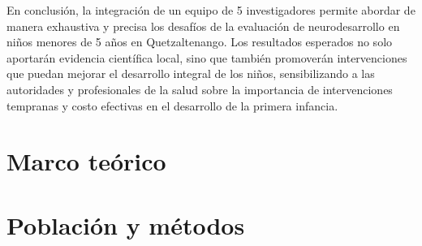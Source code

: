 \documentclass[11pt,letterpaper]{report}
\begin{document}
En conclusión, la integración de un equipo de 5 investigadores permite abordar
de manera exhaustiva y precisa los desafíos de la evaluación de neurodesarrollo
en niños menores de 5 años en Quetzaltenango. Los resultados esperados no solo
aportarán evidencia científica local, sino que también promoverán
intervenciones que puedan mejorar el desarrollo integral de los niños,
sensibilizando a las autoridades y profesionales de la salud sobre la
importancia de intervenciones tempranas y costo efectivas en el desarrollo de
la primera infancia.

	\chapter{Marco teórico}
	\chapter{Población y métodos}

\printbibliography
\end{document}
